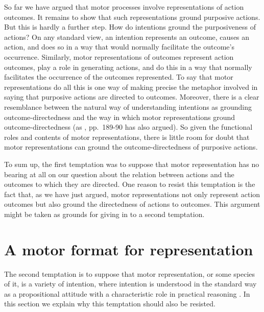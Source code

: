 \documentclass[12pt,\papersize]{extarticle}
\begin{document}
So far we have argued that motor processes involve representations of action outcomes. It remains to show that such representations ground purposive actions. But this is hardly a further step. How do intentions ground the purposiveness of actions?  On any standard view, an intention represents an outcome, causes an action, and does so in a way that would normally facilitate the outcome's occurrence. Similarly, motor representations of outcomes represent action outcomes, play a role in generating actions, and do this in a way that normally facilitates the occurrence of the outcomes represented. To say that motor representations do all this is one way of making precise the metaphor involved in saying that purposive actions are directed to outcomes.  
Moreover, there is a clear resemblance between the natural way of understanding intentions as grounding outcome-directedness and the way in which motor representations ground outcome-directedness (as \citealp{pacherie:2008_action}, pp.\ 189-90 has also argued).  
So given the functional roles and contents of motor representations, there is little room for doubt that motor representations can ground the outcome-directedness of purposive actions.

To sum up, the first temptation was to suppose that motor representation has no bearing at all on our question about the relation between actions and the outcomes to which they are directed. One reason to resist this temptation is the fact that, as we have just argued, motor representations not only represent action outcomes but also ground the directedness of actions to outcomes.  This argument might be taken as grounds for giving in to a second temptation.



\section{A motor format for representation}
The second temptation is to suppose that motor representation, or some species of it, is a variety of intention, where intention is understood in the standard way as a propositional attitude with a characteristic role in practical reasoning \citep{Bratman:1987xw}. In this section we explain why this temptation should also be resisted.
\end{document}
